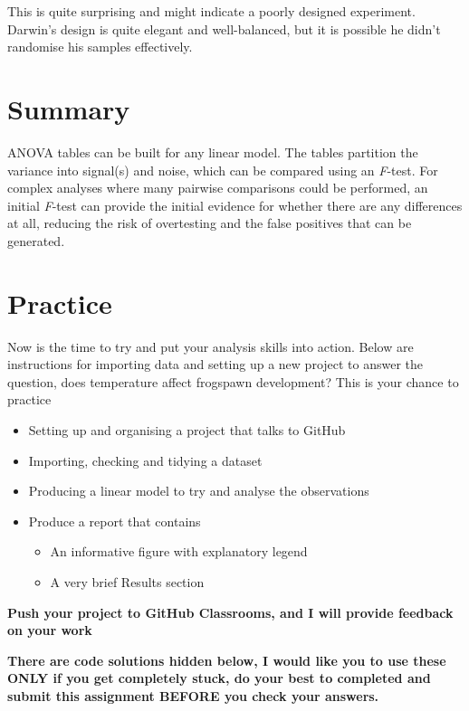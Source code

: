 \documentclass[
]{book}
\begin{document}
This is quite surprising and might indicate a poorly designed experiment. Darwin's design is quite elegant and well-balanced, but it is possible he didn't randomise his samples effectively.

\hypertarget{summary-6}{%
\section{Summary}\label{summary-6}}

ANOVA tables can be built for any linear model. The tables partition the variance into signal(s) and noise, which can be compared using an \emph{F}-test. For complex analyses where many pairwise comparisons could be performed, an initial \emph{F}-test can provide the initial evidence for whether there are any differences at all, reducing the risk of overtesting and the false positives that can be generated.

\hypertarget{practice}{%
\section{Practice}\label{practice}}

Now is the time to try and put your analysis skills into action. Below are instructions for importing data and setting up a new project to answer the question, does temperature affect frogspawn development? This is your chance to practice

\begin{itemize}
\item
  Setting up and organising a project that talks to GitHub
\item
  Importing, checking and tidying a dataset
\item
  Producing a linear model to try and analyse the observations
\item
  Produce a report that contains

  \begin{itemize}
  \item
    An informative figure with explanatory legend
  \item
    A very brief Results section
  \end{itemize}
\end{itemize}

\textbf{Push your project to GitHub Classrooms, and I will provide feedback on your work}

\textbf{There are code solutions hidden below, I would like you to use these ONLY if you get completely stuck, do your best to completed and submit this assignment BEFORE you check your answers.}
\end{document}
